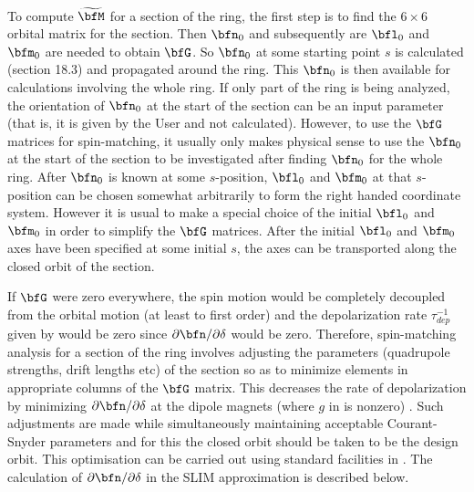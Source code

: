 {To compute $\widetilde \bfM$ for a section of the ring, the first step is to find the $6 \times 6$
orbital matrix for the section. Then $\bfn_0$ and subsequently are $\bfl_0$ and $\bfm_0$ are needed
to obtain $\bfG$.  So $\bfn_0$ at some starting point $s$ is calculated (section 18.3) and
propagated around the ring. This $\bfn_0$ is then available for calculations involving the whole
ring. If only part of the ring is being analyzed, the orientation of $\bfn_0$ at the start of the
section can be an input parameter (that is, it is given by the User and not calculated). However, to
use the $\bfG$ matrices for spin-matching, it usually only makes physical sense to use the $\bfn_0$
at the start of the section to be investigated after finding $\bfn_0$ for the whole ring. After
$\bfn_0$ is known at some $s$-position, $\bfl_0$ and $\bfm_0$ at that $s$-position can be chosen
somewhat arbitrarily to form the right handed coordinate system. However it is usual to make a
special choice of the initial $\bfl_0$ and $\bfm_0$ in order to simplify the $\bfG$ matrices. After
the initial $\bfl_0$ and $\bfm_0$ axes have been specified at some initial $s$, the axes can be
transported along the closed orbit of the section.

If $\bfG$ were zero everywhere, the spin motion would be completely decoupled from the orbital
motion (at least to first order) and the depolarization rate $\tau_{dep}^{-1}$ given by 
would be zero since $\partial\bfn / \partial\delta$ would be zero. Therefore, spin-matching analysis
for a section of the ring involves adjusting the parameters (quadrupole strengths, drift lengths
etc) of the section so as to minimize elements in appropriate columns of the $\bfG$ matrix. This 
decreases the rate of depolarization by minimizing $\partial\bfn/\partial\delta$ at the
dipole magnets (where $g$ in  is nonzero) \cite{b:barber99}. Such adjustments are made
while simultaneously maintaining acceptable Courant-Snyder parameters and for this the closed orbit
should be taken to be the design orbit.  This optimisation can be carried out using standard
facilities in \bmad. The calculation of $\partial\bfn/\partial\delta$ in the SLIM approximation is
described below.

}
